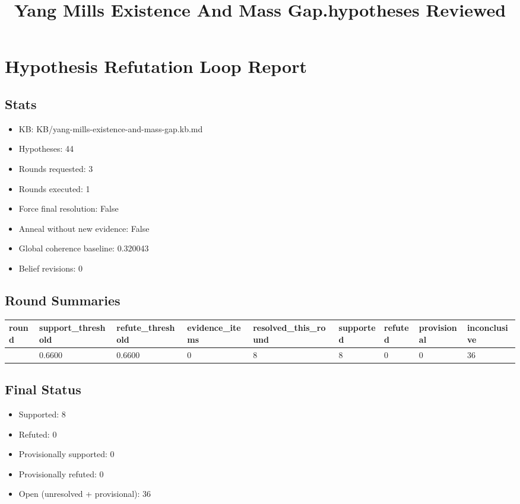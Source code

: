 \documentclass[
]{article}
\title{Yang Mills Existence And Mass Gap.hypotheses Reviewed}
\author{}
\date{}
\newcounter{none} %
\providecommand{\tightlist}{%
  \setlength{\itemsep}{0pt}\setlength{\parskip}{0pt}}
\begin{document}
\maketitle

\section{Hypothesis Refutation Loop
Report}\label{hypothesis-refutation-loop-report}

\subsection{Stats}\label{stats}

\begin{itemize}
\tightlist
\item
  KB: KB/yang-mills-existence-and-mass-gap.kb.md
\item
  Hypotheses: 44
\item
  Rounds requested: 3
\item
  Rounds executed: 1
\item
  Force final resolution: False
\item
  Anneal without new evidence: False
\item
  Global coherence baseline: 0.320043
\item
  Belief revisions: 0
\end{itemize}

\subsection{Round Summaries}\label{round-summaries}

{\def\LTcaptype{none} %
\begin{longtable}[]{@{}lllllllll@{}}
\toprule\noalign{}
round & support\_threshold & refute\_threshold & evidence\_items &
resolved\_this\_round & supported & refuted & provisional &
inconclusive \\
\midrule\noalign{}
\endhead
\bottomrule\noalign{}
\endlastfoot
1 & 0.6600 & 0.6600 & 0 & 8 & 8 & 0 & 0 & 36 \\
\end{longtable}
}

\subsection{Final Status}\label{final-status}

\begin{itemize}
\tightlist
\item
  Supported: 8
\item
  Refuted: 0
\item
  Provisionally supported: 0
\item
  Provisionally refuted: 0
\item
  Open (unresolved + provisional): 36
\end{itemize}
\end{document}
